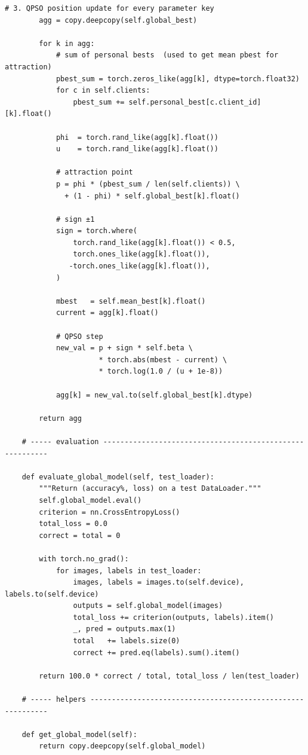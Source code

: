 \begin{lstlisting}[caption={QPSO Server Aggregation (server\_qpso.py)}, label={lst:qpso}]
        # 3. QPSO position update for every parameter key
        agg = copy.deepcopy(self.global_best)

        for k in agg:
            # sum of personal bests  (used to get mean pbest for attraction)
            pbest_sum = torch.zeros_like(agg[k], dtype=torch.float32)
            for c in self.clients:
                pbest_sum += self.personal_best[c.client_id][k].float()

            phi  = torch.rand_like(agg[k].float())
            u    = torch.rand_like(agg[k].float())

            # attraction point
            p = phi * (pbest_sum / len(self.clients)) \
              + (1 - phi) * self.global_best[k].float()

            # sign ±1
            sign = torch.where(
                torch.rand_like(agg[k].float()) < 0.5,
                torch.ones_like(agg[k].float()),
               -torch.ones_like(agg[k].float()),
            )

            mbest   = self.mean_best[k].float()
            current = agg[k].float()

            # QPSO step
            new_val = p + sign * self.beta \
                      * torch.abs(mbest - current) \
                      * torch.log(1.0 / (u + 1e-8))

            agg[k] = new_val.to(self.global_best[k].dtype)

        return agg

    # ----- evaluation ---------------------------------------------------------

    def evaluate_global_model(self, test_loader):
        """Return (accuracy%, loss) on a test DataLoader."""
        self.global_model.eval()
        criterion = nn.CrossEntropyLoss()
        total_loss = 0.0
        correct = total = 0

        with torch.no_grad():
            for images, labels in test_loader:
                images, labels = images.to(self.device), labels.to(self.device)
                outputs = self.global_model(images)
                total_loss += criterion(outputs, labels).item()
                _, pred = outputs.max(1)
                total   += labels.size(0)
                correct += pred.eq(labels).sum().item()

        return 100.0 * correct / total, total_loss / len(test_loader)

    # ----- helpers ------------------------------------------------------------

    def get_global_model(self):
        return copy.deepcopy(self.global_model)
\end{lstlisting}

